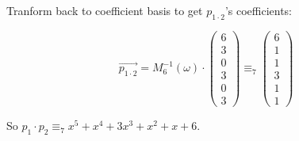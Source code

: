 \documentclass[10pt]{article}
\begin{document}
\begin{solution}
\begin{enumerate}[(a)]
{            Tranform back to coefficient basis to get $p_{1 \cdot 2}$'s coefficients:

            \[
                \vec{p_{1 \cdot 2}} =
                M_6^{-1}(\omega) \cdot
                \begin{pmatrix} 
                    6 \\
                    3 \\
                    0 \\
                    3 \\
                    0 \\
                    3
                \end{pmatrix} \equiv_7
                \begin{pmatrix} 
                    6 \\
                    1 \\
                    1 \\
                    3 \\
                    1 \\
                    1
                \end{pmatrix}
            \]

            So $p_1 \cdot p_2 \equiv_7 x^5 + x^4 + 3x^3 + x^2 + x + 6$. 
        }
    \end{enumerate}

\end{solution}

\newpage



\end{document}
